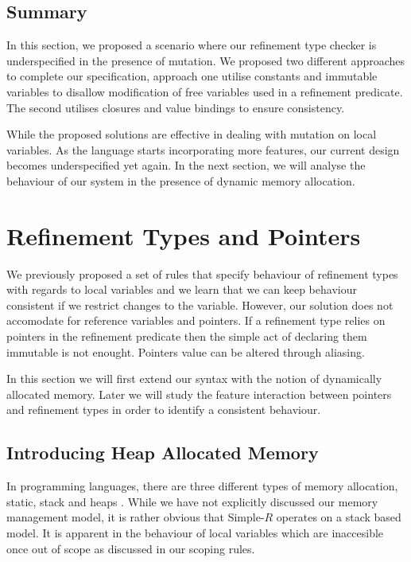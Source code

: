 \documentclass[a4paper,12pt]{report}
\begin{document}
\subsection{Summary}
In this section, we proposed a scenario where our refinement type checker is 
underspecified in the presence of mutation. We proposed two different approaches 
to complete our specification, approach one utilise constants and immutable 
variables to disallow modification of free variables used in a refinement 
predicate. The second utilises closures and value bindings to ensure 
consistency. 

\par
While the proposed solutions are effective in dealing with mutation on local 
variables. As the language starts incorporating more features, our current 
design becomes underspecified yet again. In the next section, we will analyse 
the behaviour of our system in the presence of dynamic memory allocation.

\section{Refinement Types and Pointers}
We previously proposed a set of rules that specify behaviour of refinement 
types with regards to local variables and we learn that we can keep behaviour 
consistent if we restrict changes to the variable. However, our solution does 
not accomodate for reference variables and pointers. If a refinement type 
relies on pointers in the refinement predicate then the simple act of declaring 
them immutable is not enought. Pointers value can be altered through aliasing. 

\par
In this section we will first extend our syntax with the notion of dynamically 
allocated memory. Later we will study the feature interaction between 
pointers and refinement types in order to identify a consistent behaviour. 

\subsection{Introducing Heap Allocated Memory}
In programming languages, there are three different types of memory allocation, 
static, stack and heaps \cite{heapVsStack}. While we have not explicitly 
discussed our memory management model, it is rather obvious that Simple-$R$ 
operates on a stack based model. It is apparent in the behaviour of local 
variables which are inaccesible once out of scope as discussed in our scoping rules. 
\end{document}

